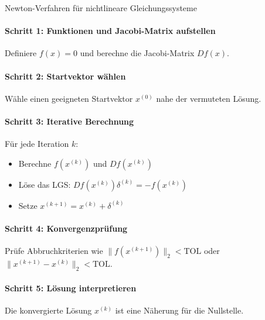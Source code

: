 \begin{KR}{Newton-Verfahren für nichtlineare Gleichungssysteme}
\paragraph{Schritt 1: Funktionen und Jacobi-Matrix aufstellen}
Definiere $f(x) = 0$ und berechne die Jacobi-Matrix $Df(x)$.

\paragraph{Schritt 2: Startvektor wählen}
Wähle einen geeigneten Startvektor $x^{(0)}$ nahe der vermuteten Lösung.

\paragraph{Schritt 3: Iterative Berechnung}
Für jede Iteration $k$:
\begin{itemize}
    \item Berechne $f(x^{(k)})$ und $Df(x^{(k)})$
    \item Löse das LGS: $Df(x^{(k)}) \delta^{(k)} = -f(x^{(k)})$
    \item Setze $x^{(k+1)} = x^{(k)} + \delta^{(k)}$
\end{itemize}

\paragraph{Schritt 4: Konvergenzprüfung}
Prüfe Abbruchkriterien wie $\|f(x^{(k+1)})\|_2 < \text{TOL}$ oder $\|x^{(k+1)} - x^{(k)}\|_2 < \text{TOL}$.

\paragraph{Schritt 5: Lösung interpretieren}
Die konvergierte Lösung $x^{(k)}$ ist eine Näherung für die Nullstelle.
\end{KR}

